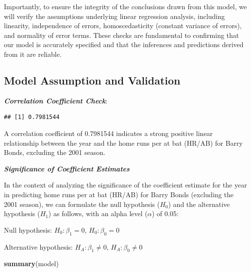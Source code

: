 \documentclass[
]{article}
\newenvironment{Shaded}{\begin{snugshade}}{\end{snugshade}}
\newcommand{\FunctionTok}[1]{\textcolor[rgb]{0.13,0.29,0.53}{\textbf{#1}}}
\newcommand{\NormalTok}[1]{#1}
\newcommand{\SpecialCharTok}[1]{\textcolor[rgb]{0.81,0.36,0.00}{\textbf{#1}}}
\begin{document}
Importantly, to ensure the integrity of the conclusions drawn from this
model, we will verify the assumptions underlying linear regression
analysis, including linearity, independence of errors, homoscedasticity
(constant variance of errors), and normality of error terms. These
checks are fundamental to confirming that our model is accurately
specified and that the inferences and predictions derived from it are
reliable.

\subsection{Model Assumption and
Validation}\label{model-assumption-and-validation}

\textbf{\emph{Correlation Coefficient Check}}:

\begin{Shaded}
\end{Shaded}

\begin{verbatim}
## [1] 0.7981544
\end{verbatim}

A correlation coefficient of 0.7981544 indicates a strong positive
linear relationship between the year and the home runs per at bat
(HR/AB) for Barry Bonds, excluding the 2001 season.

\textbf{\emph{Significance of Coefficient Estimates}}

In the context of analyzing the significance of the coefficient estimate
for the year in predicting home runs per at bat (HR/AB) for Barry Bonds
(excluding the 2001 season), we can formulate the null hypothesis
(\(H_0\)) and the alternative hypothesis (\(H_1\)) as follows, with an
alpha level (\(\alpha\)) of 0.05:

Null hypothesis: \(H_{0}: \beta_{1} = 0\), \(H_{0}: \beta_{0} = 0\)

Alternative hypothesis: \(H_{A}: \beta_{1} \neq 0\),
\(H_{A}: \beta_{0} \neq 0\)

\begin{Shaded}
\begin{Highlighting}[]
\FunctionTok{summary}\NormalTok{(model)}
\end{Highlighting}
\end{Shaded}
\end{document}
